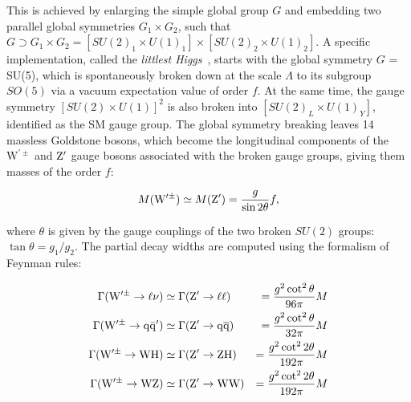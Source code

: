 This is achieved by enlarging the simple global group $G$ and embedding two parallel global symmetries $G_1 \times G_2$, such that $G \supset G_1 \times G_2 = [SU(2)_1 \times U(1)_1] \times[SU(2)_2 \times U(1)_2]$.
A specific implementation, called the \textit{littlest Higgs}~\cite{Arkani:2002LH,Burdman:2002ns}, starts with the global symmetry $G$ = SU(5), which is spontaneously broken down at the scale $\Lambda$ to its subgroup $SO(5)$ via a vacuum expectation value of order $f$. At the same time, the gauge symmetry $[SU(2) \times U(1)]^2$ is also broken into $[SU(2)_L \times U(1)_Y]$, identified as the SM gauge group.
The global symmetry breaking leaves 14 massless Goldstone bosons, which become the longitudinal components of the $\mathrm{W}^{\prime\pm}$  and $\mathrm{Z}^\prime$ gauge bosons associated with the broken gauge groups, giving them masses of the order $f$:

\begin{equation}\label{eqn:LHvprimeMass}
M(\mathrm{W}^{\prime\pm}) \simeq M(\mathrm{Z}^\prime) = \frac{g}{\sin2\theta}f,
\end{equation}

\noindent where $\theta$ is given by the gauge couplings of the two broken $SU(2)$ groups: $\tan\theta = g_1/g_2$.
The partial decay widths are computed using the formalism of Feynman rules:

\begin{equation}
\begin{aligned}
\Gamma(\mathrm{W}^{\prime\pm} \to \ell\nu) & \simeq \Gamma(\mathrm{Z}^\prime \to \ell\ell) & = \frac{g^2\cot^2\theta}{96\pi}M\\
\Gamma(\mathrm{W}^{\prime\pm} \to \mathrm{q}\bar{\mathrm{q}}^\prime) & \simeq \Gamma(\mathrm{Z}^\prime \to \mathrm{q}\overline{\mathrm{q}}) & = \frac{g^2\cot^2\theta}{32\pi}M\\
\Gamma(\mathrm{W}^{\prime\pm} \to \mathrm{W}\mathrm{H}) & \simeq \Gamma(\mathrm{Z}^\prime \to \mathrm{Z}\mathrm{H}) & = \frac{g^2\cot^22\theta}{192\pi}M\\
\Gamma(\mathrm{W}^{\prime\pm} \to \mathrm{W}\mathrm{Z}) & \simeq \Gamma(\mathrm{Z}^\prime \to \mathrm{W}\mathrm{W}) & = \frac{g^2\cot^22\theta}{192\pi}M
\end{aligned} 
\end{equation}

